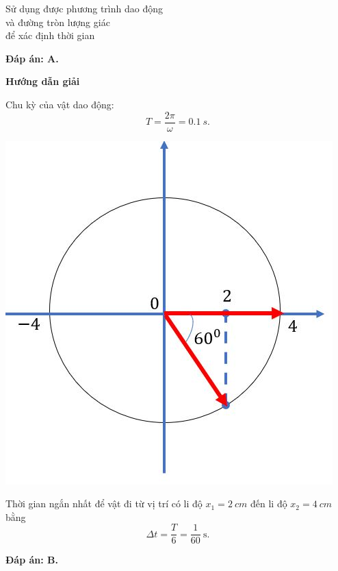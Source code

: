 \begin{dang}{Sử dụng được phương trình dao động\\ và đường tròn lượng giác\\ để xác định thời gian}
{		
		
		\textbf{Đáp án: A.}
	}
	{\begin{center}
			\textbf{Hướng dẫn giải}
		\end{center}
		
		Chu kỳ của vật dao động:
		\begin{equation*}
			T =\dfrac{2\pi}{\omega} =\SI{0,1}{s}.
		\end{equation*}
		\begin{center}
			\includegraphics[scale=0.6]{../figs/VN12-PH-02-A-001-7-V2-3.jpg}
		\end{center}
		Thời gian ngắn nhất để vật đi từ vị trí có li độ $x_1 = \SI{2}{cm}$ đến li độ $x_2 =\SI{4}{cm}$ bằng
		\begin{equation*}
			\Delta t =\dfrac{T}{6}= \dfrac{1}{60}\ \text{s}.
		\end{equation*}
		
		\textbf{Đáp án: B.}
	}
	
\end{dang}
